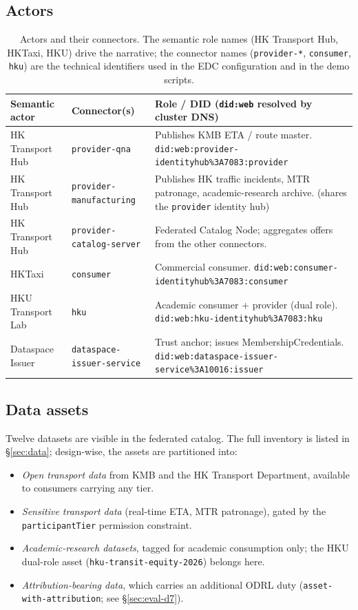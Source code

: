 \documentclass[11pt,a4paper]{article}
\DeclareRobustCommand{\code}[1]{\texttt{\small #1}}
\begin{document}
\subsection{Actors}

\begin{table}[H]
\small
\caption{Actors and their connectors. The semantic role names (HK Transport
Hub, HKTaxi, HKU) drive the narrative; the connector names (\code{provider-*},
\code{consumer}, \code{hku}) are the technical identifiers used in the EDC
configuration and in the demo scripts.}
\label{tab:actors}
\begin{tabularx}{\linewidth}{@{}l l X@{}}
\toprule
\textbf{Semantic actor} & \textbf{Connector(s)} & \textbf{Role / DID (\code{did:web} resolved by cluster DNS)} \\
\midrule
HK Transport Hub & \code{provider-qna} & Publishes KMB ETA / route master.
\nolinkurl{did:web:provider-identityhub\%3A7083:provider} \\
HK Transport Hub & \code{provider-manufacturing} & Publishes HK traffic incidents,
MTR patronage, academic-research archive. (shares the \code{provider} identity hub) \\
HK Transport Hub & \code{provider-catalog-server} & Federated Catalog Node; aggregates offers from the other connectors. \\
HKTaxi & \code{consumer} & Commercial consumer.
\nolinkurl{did:web:consumer-identityhub\%3A7083:consumer} \\
HKU Transport Lab & \code{hku} & Academic consumer + provider (dual role).
\nolinkurl{did:web:hku-identityhub\%3A7083:hku} \\
Dataspace Issuer & \code{dataspace-issuer-service} & Trust anchor; issues MembershipCredentials.
\nolinkurl{did:web:dataspace-issuer-service\%3A10016:issuer} \\
\bottomrule
\end{tabularx}
\end{table}

\subsection{Data assets}

Twelve datasets are visible in the federated catalog. The full inventory is
listed in §\ref{sec:data}; design-wise, the assets are partitioned into:

\begin{itemize}
  \item \emph{Open transport data} from KMB and the HK Transport Department,
    available to consumers carrying any tier.
  \item \emph{Sensitive transport data} (real-time ETA, MTR patronage),
    gated by the \code{participantTier} permission constraint.
  \item \emph{Academic-research datasets}, tagged for academic consumption
    only; the HKU dual-role asset (\code{hku-transit-equity-2026}) belongs
    here.
  \item \emph{Attribution-bearing data}, which carries an additional ODRL
    duty (\code{asset-with-attribution}; see §\ref{sec:eval-d7}).
\end{itemize}
\end{document}
